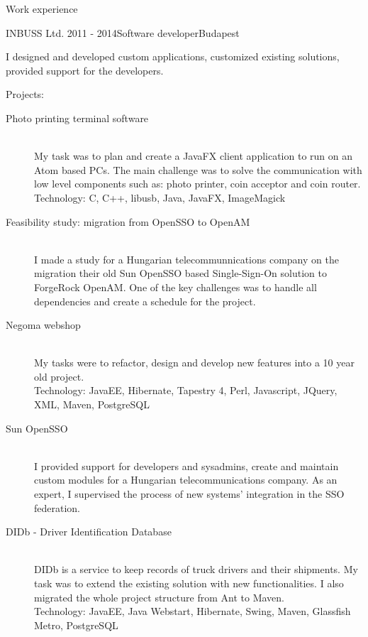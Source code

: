 \documentclass{resume} %
\begin{document}
\begin{rSection}{Work experience}
\begin{rSubsection}{INBUSS Ltd.}
{2011 - 2014}{Software developer}{Budapest}
\item I designed and developed custom applications, customized existing solutions, provided support for the developers.
\item Projects:
	\begin{description}
		\item[Photo printing terminal software] \hfill \\
		My task was to plan and create a JavaFX client application to run on an Atom based PCs.
		The main challenge was to solve the communication with low level components such as: photo printer,
		coin acceptor and coin router. \\
		Technology: C, C++, libusb, Java, JavaFX, ImageMagick
		\item[Feasibility study: migration from OpenSSO to OpenAM] \hfill \\
		I made a study for a Hungarian telecommunnications company on the migration their old Sun OpenSSO based
		Single-Sign-On solution to ForgeRock OpenAM.
		One of the key challenges was to handle all dependencies and create a schedule for the project.
		\item[Negoma webshop] \hfill \\
		My tasks were to refactor, design and develop new features into a 10 year old project. \\
		Technology: JavaEE, Hibernate, Tapestry 4, Perl, Javascript, JQuery, XML, Maven, PostgreSQL
		\item[Sun OpenSSO] \hfill \\
		I provided support for developers and sysadmins, create and maintain custom modules for
		a Hungarian telecommunications company. As an expert, I supervised the process of
		new systems' integration in the SSO federation.
		\item[DIDb - Driver Identification Database] \hfill \\
		DIDb is a service to keep records of truck drivers and their shipments.
		My task was to extend the existing solution with new functionalities.
		I also migrated the whole project structure from Ant to Maven. \\
		Technology: JavaEE, Java Webstart, Hibernate, Swing, Maven, Glassfish Metro,
		PostgreSQL
	\end{description}
\end{rSubsection}



\end{rSection}
\end{document}
